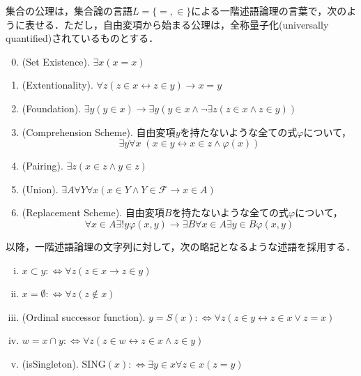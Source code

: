 \documentclass[uplatex, dvipdfmx]{jsreport}
\begin{document}
\begin{shadebox}
    \begin{definition}[集合の公理系ZF]\label{def-ZF-theory}集合の公理は，集合論の言語$L=\{=,\in\}$による一階述語論理の言葉で，次のように表せる．ただし，自由変項から始まる公理は，全称量子化(universally quantified)されているものとする．
        \begin{enumerate}\setcounter{enumi}{-1}
            \item (Set Existence). $\exists x(x=x)$
            \item (Extentionality). $\forall z(z\in x\leftrightarrow z\in y)\rightarrow x=y$
            \item (Foundation). $\exists y(y\in x)\rightarrow\exists y(y\in x\land \lnot\exists z(z\in x\land z\in y))$
            \item (Comprehension Scheme). 自由変項$y$を持たないような全ての式$\varphi$について，
            \[\exists y\forall x\;(x\in y\leftrightarrow x\in z\land\varphi(x))\]
            \item (Pairing). $\exists z(x\in z\land y\in z)$
            \item (Union). $\exists A\forall Y\forall x(x\in Y\land Y\in\mathcal{F}\rightarrow x\in A)$
            \item (Replacement Scheme). 自由変項$B$を持たないような全ての式$\varphi$について，
            \[\forall x\in A\exists!y\varphi(x,y)\rightarrow\exists B\forall x\in A\exists y\in B\varphi(x,y)\]
        \end{enumerate}
        以降，一階述語論理の文字列に対して，次の略記となるような述語を採用する．
        \begin{screen}
            \begin{notation}\mbox{}
                \begin{enumerate}[(i)]
                    \item $x\subset y:\Leftrightarrow\forall z(z\in x\rightarrow z\in y)$
                    \item $x=\emptyset:\Leftrightarrow\forall z(z\notin x)$
                    \item (Ordinal successor function). $y=S(x):\Leftrightarrow\forall z(z\in y\leftrightarrow z\in x\lor z=x)$
                    \item $w=x\cap y:\Leftrightarrow\forall z(z\in w\leftrightarrow z\in x\land z\in y)$
                    \item (isSingleton). $\mathrm{SING}(x):\Leftrightarrow\exists y\in x\forall z\in x(z=y)$
                \end{enumerate}

\end{notation}
\end{screen}
\end{definition}
\end{shadebox}
\end{document}
